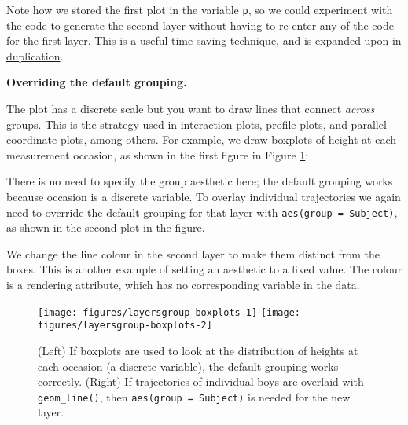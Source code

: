 Note how we stored the first plot in the variable \texttt{p}, so we
could experiment with the code to generate the second layer without
having to re-enter any of the code for the first layer. This is a useful
time-saving technique, and is expanded upon in
\hyperref[cha:duplication]{duplication}.

\textbf{Overriding the default grouping.}

The plot has a discrete scale but you want to draw lines that connect
\emph{across} groups. This is the strategy used in interaction plots,
profile plots, and parallel coordinate plots, among others. For example,
we draw boxplots of height at each measurement occasion, as shown in the
first figure in Figure \ref{fig:group-boxplots}: 

\begin{Shaded}
\begin{Highlighting}[]
\StringTok{ }\StringTok{ }\NormalTok{()}
\end{Highlighting}
\end{Shaded}

There is no need to specify the group aesthetic here; the default
grouping works because occasion is a discrete variable. To overlay
individual trajectories we again need to override the default grouping
for that layer with \texttt{aes(group = Subject)}, as shown in the
second plot in the figure.

\begin{Shaded}
\begin{Highlighting}[]
\StringTok{ }\NormalTok{(}\NormalTok{(}  \NormalTok{)}
\end{Highlighting}
\end{Shaded}

We change the line colour in the second layer to make them distinct from
the boxes. This is another example of setting an aesthetic to a fixed
value. The colour is a rendering attribute, which has no corresponding
variable in the data. 

\begin{figure}

{\centering \texttt{[image: figures/layersgroup-boxplots-1]} \texttt{[image: figures/layersgroup-boxplots-2]} 

}

\caption{(Left) If boxplots are used to look at the distribution of heights at each occasion (a discrete variable), the default grouping works correctly.  (Right) If trajectories of individual boys are overlaid with \texttt{geom\_line()}, then \texttt{aes(group = Subject)} is needed for the new layer.\label{fig:group-boxplots}}
\end{figure}

